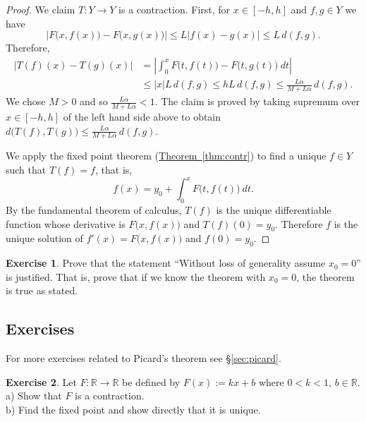 \documentclass[12pt]{book}
\newcommand{\abs}[1]{\left\lvert {#1} \right\rvert}
\newcommand{\R}{{\mathbb{R}}}
\theoremstyle{plain}
\theoremstyle{remark}
\theoremstyle{definition}
\newenvironment{exnote}{\small}{}
\theoremstyle{exercise}
\newtheorem{exercise}{Exercise}[section]
\theoremstyle{example}
\newcommand{\sectionref}[1]{\hyperref[#1]{\S\ref*{#1}}}
\newcommand{\thmref}[1]{\hyperref[#1]{Theorem~\ref*{#1}}}
\begin{document}
\begin{proof}
We claim $T \colon Y \to Y$ is a contraction.  First, for $x \in [-h,h]$
and $f,g \in Y$ we have
\begin{equation*}
\abs{F\bigl(x,f(x)\bigr) - F\bigl(x,g(x)\bigr)} \leq
L\abs{f(x)- g(x)} \leq L \, d(f,g) .
\end{equation*}
Therefore,
\begin{equation*}
\begin{split}
\abs{T(f)(x) - T(g)(x)}
&= \abs{\int_0^x F\bigl(t,f(t)\bigr) - F\bigl(t,g(t)\bigr)~dt} \\
& \leq \abs{x} L \, d(f,g)
 \leq h L\, d(f,g)
 \leq \frac{L\alpha}{M+L\alpha} \, d(f,g) .
\end{split}
\end{equation*}
We chose $M > 0$ and so
$\frac{L\alpha}{M+L\alpha} < 1$.  The claim is proved by
taking supremum over $x \in [-h,h]$ of the left hand side above to obtain
$d\bigl(T(f),T(g)\bigr) \leq \frac{L\alpha}{M+L\alpha} \, d(f,g)$.

We apply the fixed point theorem (\thmref{thm:contr})
to find a unique $f \in Y$ such that $T(f) = f$, that is,
\begin{equation*} %
f(x) = y_0 + \int_0^x F\bigl(t,f(t)\bigr)~dt .
\end{equation*}
By the fundamental theorem of calculus, $T(f)$ is the unique differentiable 
function whose derivative is
$F\bigl(x,f(x)\bigr)$ and $T(f)(0) = y_0$.  Therefore $f$ is the unique
solution of $f'(x) = F\bigl(x,f(x)\bigr)$ and $f(0) = y_0$.
\end{proof}

\begin{exercise}
Prove that the statement ``Without loss of generality assume $x_0 = 0$'' is
justified.  That is, prove that if we know the theorem with $x_0 = 0$, the
theorem is true as stated.
\end{exercise}

\subsection{Exercises}

\begin{exnote}
For more exercises related to Picard's theorem see \sectionref{sec:picard}.
\end{exnote}

\begin{exercise}
Let $F \colon \R \to \R$ be defined by
$F(x) := kx + b$ where $0 < k < 1$, $b \in \R$.\\
a) Show that $F$ is a contraction.\\
b) Find the fixed
point and show directly that it is unique.
\end{exercise}
\end{document}
